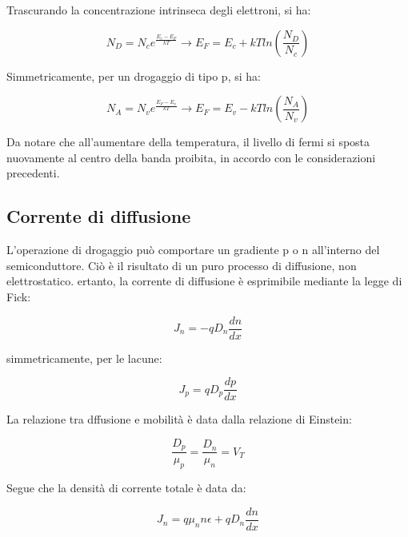 \documentclass{article}
\begin{document}
Trascurando la concentrazione intrinseca degli elettroni, si ha:

\begin{equation}
    N_D= N_c e^{\frac{E_c-E_F}{kT}} \rightarrow E_F = E_c + kT ln(\frac{N_D}{N_c})
\end{equation}

Simmetricamente, per un drogaggio di tipo p, si ha:

\begin{equation}
    N_A= N_v e^{\frac{E_F-E_v}{kT}} \rightarrow E_F = E_v - kT ln(\frac{N_A}{N_v})
\end{equation}

Da notare che all'aumentare della temperatura, il livello di fermi si sposta nuovamente al centro della banda proibita, in accordo con le considerazioni precedenti.

\subsection{Corrente di diffusione}

L'operazione di drogaggio può comportare un gradiente p o n all'interno del semiconduttore.
Ciò è il risultato di un puro processo di diffusione, non elettrostatico. ertanto, la corrente di
diffusione è esprimibile mediante la legge di Fick:

\begin{equation}
    J_n = -q D_n \frac{dn}{dx}
\end{equation}

simmetricamente, per le lacune:

\begin{equation}
    J_p = q D_p \frac{dp}{dx}
\end{equation}

La relazione tra dffusione e mobilità è data dalla relazione di Einstein:

\begin{equation}
   \frac{D_p}{\mu_p} = \frac{D_n}{\mu_n} = V_T
\end{equation}

Segue che la densità di corrente totale è data da:

\begin{equation}
    J_n= q\mu_n n \epsilon+ qD_n \frac{dn}{dx}
\end{equation}
\end{document}
